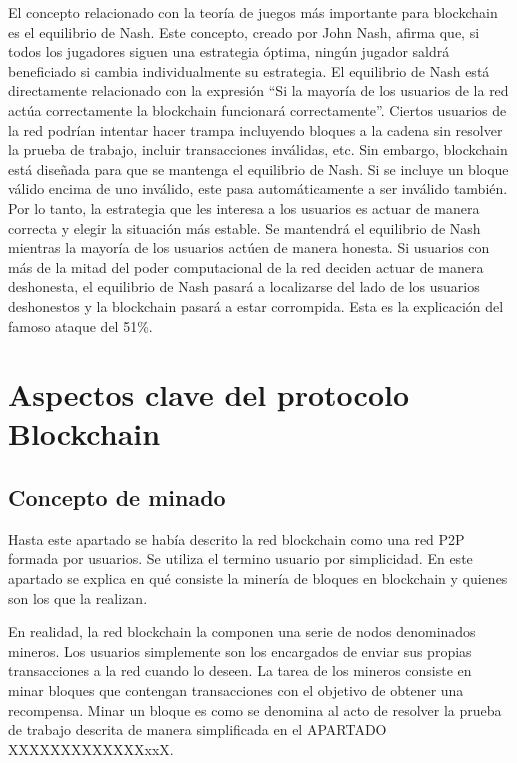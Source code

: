 El concepto relacionado con la teoría de juegos más importante para blockchain es el equilibrio de Nash. Este concepto, creado por John Nash, afirma que, si todos los jugadores siguen una estrategia óptima, ningún jugador saldrá beneficiado si cambia individualmente su estrategia. El equilibrio de Nash está directamente relacionado con la expresión “Si la mayoría de los usuarios de la red actúa correctamente la blockchain funcionará correctamente”. Ciertos usuarios de la red podrían intentar hacer trampa incluyendo bloques a la cadena sin resolver la prueba de trabajo, incluir transacciones inválidas, etc. Sin embargo, blockchain está diseñada para que se mantenga el equilibrio de Nash. Si se incluye un bloque válido encima de uno inválido, este pasa automáticamente a ser inválido también. Por lo tanto, la estrategia que les interesa a los usuarios es actuar de manera correcta y elegir la situación más estable. Se mantendrá el equilibrio de Nash mientras la mayoría de los usuarios actúen de manera honesta. Si usuarios con más de la mitad del poder computacional de la red deciden actuar de manera deshonesta, el equilibrio de Nash pasará a localizarse del lado de los usuarios deshonestos y la blockchain pasará a estar corrompida. Esta es la explicación del famoso ataque del 51\%.

\section{Aspectos clave del protocolo Blockchain}
\subsection{Concepto de minado}
Hasta este apartado se había descrito la red blockchain como una red P2P formada por usuarios. Se utiliza el termino usuario por simplicidad. En este apartado se explica en qué consiste la minería de bloques en blockchain y quienes son los que la realizan. \newline

En realidad, la red blockchain la componen una serie de nodos denominados mineros. Los usuarios simplemente son los encargados de enviar sus propias transacciones a la red cuando lo deseen. La tarea de los mineros consiste en minar bloques que contengan transacciones con el objetivo de obtener una recompensa. Minar un bloque es como se denomina al acto de resolver la prueba de trabajo descrita de manera simplificada en el APARTADO XXXXXXXXXXXXXxxX.

